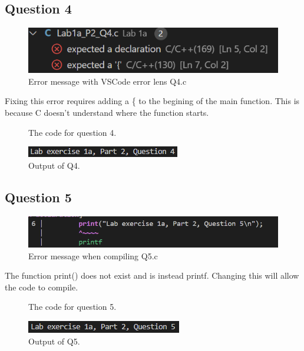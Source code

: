 \documentclass{article}
\begin{document}
\begin{flushleft}
  \subsection{Question 4}
  \begin{figure}[!ht]
    \centering
    \includegraphics[width=\linewidth]{Q4-error.png}
    \caption{Error message with VSCode error lens Q4.c}
  \end{figure}
  Fixing this error requires adding a \{ to the begining of the main function. This is because C doesn't understand where the function starts.
  \begin{figure}[!ht]
    \centering
    
    \caption{The code for question 4.}
  \end{figure}
  \begin{figure}[!ht]
    \centering
    \includegraphics[width=\linewidth]{Q4-output.png}
    \caption{Output of Q4.}
  \end{figure}
  \subsection{Question 5}
  \begin{figure}[!ht]
    \centering
    \includegraphics[width=\linewidth]{Q5-error.png}
    \caption{Error message when compiling Q5.c}
  \end{figure}
  The function print() does not exist and is instead printf. Changing this will allow the code to compile.
  \begin{figure}[!ht]
    \centering
    
    \caption{The code for question 5.}
  \end{figure}
  \begin{figure}[!ht]
    \centering
    \includegraphics[width=\linewidth]{Q5-output.png}
    \caption{Output of Q5.}
  \end{figure}

\end{flushleft}
\end{document}
